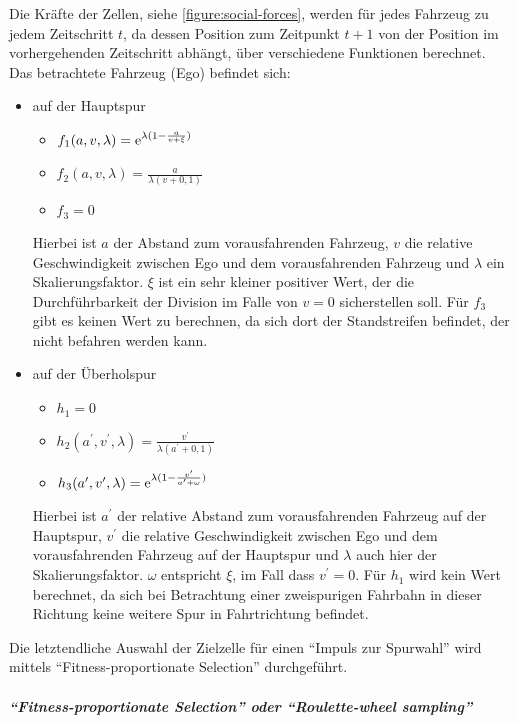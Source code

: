 Die Kräfte der Zellen, siehe \cref{figure:social-forces}, werden für jedes Fahrzeug zu jedem Zeitschritt $t$, da dessen Position zum Zeitpunkt $t + 1$ von der Position im vorhergehenden Zeitschritt abhängt, über verschiedene Funktionen berechnet. Das betrachtete Fahrzeug (Ego) befindet sich:
\begin{itemize}
	\item auf der Hauptspur 
	\begin{itemize}
		\item $f_{1}(a,v,\lambda) = \operatorname{e}^{\lambda(1-\frac{a}{v+\xi})}$ 
		\item $f_{2}(a,v,\lambda) = \frac{a}{\lambda(v+0,1)}$ 
		\item $f_{3} = 0$ 
	\end{itemize}
Hierbei ist $a$ der Abstand zum vorausfahrenden Fahrzeug, $v$ die relative Geschwindigkeit zwischen Ego und dem vorausfahrenden Fahrzeug und $\lambda$ ein Skalierungsfaktor. $\xi$ ist ein sehr kleiner positiver Wert, der die Durchführbarkeit der Division im Falle von $v=0$ sicherstellen soll. Für $f_{3}$ gibt es keinen Wert zu berechnen, da sich dort der Standstreifen befindet, der nicht befahren werden kann.
	\item auf der Überholspur 
	\begin{itemize}
		\item $h_{1} = 0$ 
		\item $h_{2}(a^{\prime},v^{\prime},\lambda) = \frac{v^{\prime}}{\lambda(a^{\prime}+0,1)}$ 
		\item $h_{3}(a^{\prime},v^{\prime},\lambda) = \operatorname{e}^{\lambda(1-\frac{v^{\prime}}{a^{\prime}+\omega})}$ 
	\end{itemize}
Hierbei ist $a^{\prime}$ der relative Abstand zum vorausfahrenden Fahrzeug auf der Hauptspur, $v^{\prime}$ die relative Geschwindigkeit zwischen Ego und dem vorausfahrenden Fahrzeug auf der Hauptspur und $\lambda$ auch hier der Skalierungsfaktor. $\omega$ entspricht $\xi$, im Fall dass $v^{\prime}=0$. Für $h_{1}$ wird kein Wert berechnet, da sich bei Betrachtung einer zweispurigen Fahrbahn in dieser Richtung keine weitere Spur in Fahrtrichtung befindet.
\end{itemize}

Die letztendliche Auswahl der Zielzelle für einen \enquote{Impuls zur Spurwahl} wird mittels \enquote{Fitness-proportionate Selection} durchgeführt.


\subparagraph{\enquote{Fitness-proportionate Selection} oder \enquote{Roulette-wheel sampling}}

